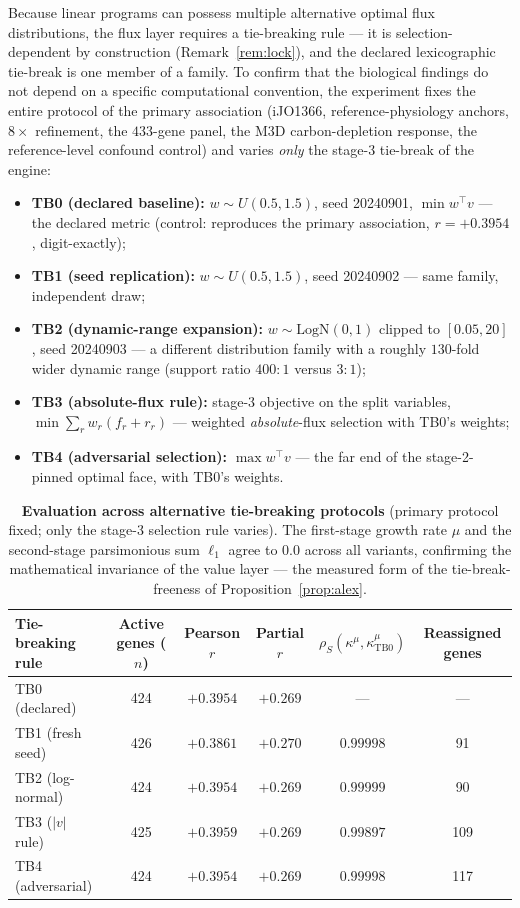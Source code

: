 \documentclass[11pt,a4paper]{article}
\theoremstyle{plain}
\theoremstyle{definition}
\theoremstyle{remark}
\newcommand{\kmu}{\kappa^{\mu}}
\begin{document}
Because linear programs can possess multiple alternative optimal
flux distributions, the flux layer requires a tie-breaking rule ---
it is selection-dependent by
construction
(Remark~\ref{rem:lock}), and the declared lexicographic tie-break is
one member of a family. To confirm that the biological findings do
not depend on a specific computational convention, the experiment
fixes the entire protocol of the primary association (iJO1366,
reference-physiology anchors, $8\times$ refinement, the $433$-gene
panel, the M3D carbon-depletion response, the reference-level
confound control) and varies \emph{only} the stage-3 tie-break of the
engine:
\begin{itemize}
\item \textbf{TB0 (declared baseline):} $w \sim U(0.5, 1.5)$, seed
      20240901, $\min w^\top v$ --- the declared metric (control:
      reproduces the primary association, $r = +0.3954$,
      digit-exactly);
\item \textbf{TB1 (seed replication):} $w \sim U(0.5, 1.5)$, seed
      20240902 --- same family, independent draw;
\item \textbf{TB2 (dynamic-range expansion):} $w \sim
      \mathrm{LogN}(0, 1)$ clipped to $[0.05, 20]$, seed 20240903 ---
      a different distribution family with a roughly $130$-fold wider
      dynamic range (support ratio $400{:}1$ versus $3{:}1$);
\item \textbf{TB3 (absolute-flux rule):} stage-3 objective on the
      split variables, $\min \sum_r w_r (f_r + r_r)$ --- weighted
      \emph{absolute}-flux selection with TB0's weights;
\item \textbf{TB4 (adversarial selection):} $\max w^\top v$ --- the
      far end of the stage-2-pinned optimal face, with TB0's weights.
\end{itemize}

\begin{table}[t]
\centering
\caption{\textbf{Evaluation across alternative tie-breaking
protocols} (primary protocol fixed; only the stage-3 selection rule
varies). The first-stage growth rate $\mu$ and the second-stage
parsimonious sum $\ell_1$ agree to $0.0$ across all variants,
confirming the mathematical invariance of the value layer --- the
measured form of the tie-break-freeness of
Proposition~\ref{prop:alex}.}
\label{tab:v8}
\begin{tabular}{lccccc}
\toprule
Tie-breaking rule & Active genes ($n$) & Pearson $r$ & Partial $r$ &
$\rho_S(\kmu, \kmu_{\mathrm{TB0}})$ & Reassigned genes \\
\midrule
TB0 (declared)     & 424 & $+0.3954$ & $+0.269$ & --- & --- \\
TB1 (fresh seed)   & 426 & $+0.3861$ & $+0.270$ & $0.99998$ & 91 \\
TB2 (log-normal)   & 424 & $+0.3954$ & $+0.269$ & $0.99999$ & 90 \\
TB3 ($|v|$ rule)   & 425 & $+0.3959$ & $+0.269$ & $0.99897$ & 109 \\
TB4 (adversarial)  & 424 & $+0.3954$ & $+0.269$ & $0.99998$ & 117 \\
\bottomrule
\end{tabular}
\end{table}
\end{document}
